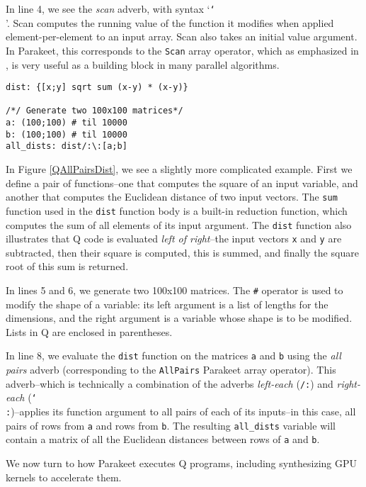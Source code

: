 \documentclass[preprint]{sigplanconf}
\begin{document}
In line 4, we see the \emph{scan} adverb, with syntax `\texttt{\char`\\}'.
Scan computes the running value of the function it modifies when applied
element-per-element to an input array. Scan also takes an initial value
argument.  In Parakeet, this corresponds to the \texttt{Scan} array operator,
which as emphasized in \cite{Blel90}, is very useful as a building block in many
parallel algorithms.

\begin{lstlisting}[caption=Q All-Pairs Distance Example]
dist: {[x;y] sqrt sum (x-y) * (x-y)}

/*/ Generate two 100x100 matrices*/
a: (100;100) # til 10000
b: (100;100) # til 10000
all_dists: dist/:\:[a;b]
\end{lstlisting}
\label{QAllPairsDist}

In Figure \ref{QAllPairsDist}, we see a slightly more complicated example.
First we define a pair of functions--one that computes the square of an input
variable, and another that computes the Euclidean distance of two input
vectors.  The \texttt{sum} function used in the \texttt{dist} function body is a
built-in reduction function, which computes the sum of all elements of its input
argument.  The \texttt{dist} function also illustrates that Q code is evaluated
\emph{left of right}--the input vectors \texttt{x} and \texttt{y} are
subtracted, then their square is computed, this is summed, and finally the
square root of this sum is returned.

In lines 5 and 6, we generate two 100x100 matrices.  The \texttt{\#} operator is
used to modify the shape of a variable: its left argument is a list of lengths
for the dimensions, and the right argument is a variable whose shape is to be
modified.  Lists in Q are enclosed in parentheses.

In line 8, we evaluate the \texttt{dist} function on the matrices \texttt{a} and
\texttt{b} using the {\it all pairs} adverb (corresponding to the
\texttt{AllPairs} Parakeet array operator).  This adverb--which is technically
a combination of the adverbs \emph{left-each} (\texttt{/:}) and
\emph{right-each} (\texttt{\char`\\:})--applies its function argument to all
pairs of each of its inputs--in this case, all pairs of rows from \texttt{a} and
rows from \texttt{b}.  The resulting \texttt{all\_dists} variable will contain a
matrix of all the Euclidean distances between rows of \texttt{a} and \texttt{b}.

We now turn to how Parakeet executes Q programs, including synthesizing GPU
kernels to accelerate them.
\end{document}
